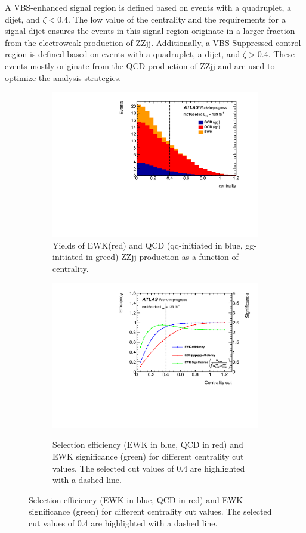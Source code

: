 A VBS-enhanced signal region is defined based on events with a quadruplet, a dijet, and $\zeta<0.4$. The low value of the centrality and the requirements for a signal dijet ensures the events in this signal region originate in a larger fraction from the electroweak production of ZZjj. Additionally, a VBS Suppressed control region is defined based on events with a quadruplet, a dijet, and $\zeta>0.4$. These events mostly originate from the QCD production of ZZjj and are used to optimize the analysis strategies.

\begin{figure}[ht]
\begin{subfigure}{.48\textwidth}
  \centering
  \includegraphics[width=.8\linewidth]{figures/AnalysisOverview/centrality_Dist.pdf}  
  \caption{Yields of EWK(red) and QCD (qq-initiated in blue, gg-initiated in greed) ZZjj production as a function of centrality.}
  \label{fig:centrality_a}
\end{subfigure}
\begin{subfigure}{.48\textwidth}
  \centering
  \includegraphics[width=.8\linewidth]{figures/AnalysisOverview/centrality_Cut.pdf}  \\
  \caption{Selection efficiency (EWK in blue, QCD in red) and EWK significance (green) for different centrality cut values. The selected cut values of 0.4 are highlighted with a dashed line.}
  \label{fig:centrality_b}
\end{subfigure}

\end{figure}